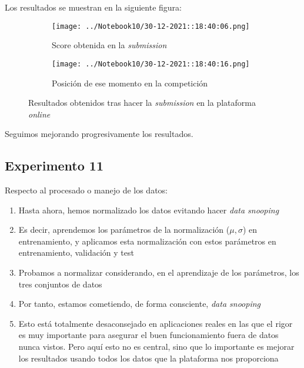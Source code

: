 \documentclass[11pt]{article}
\begin{document}
Los resultados se muestran en la siguiente figura:

\begin{figure}[H]
    \centering

    \begin{subfigure}[b]{0.45 \textwidth}
        \texttt{[image: ../Notebook10/30-12-2021::18:40:06.png]}
        \caption{Score obtenida en la \emph{submission}}
    \end{subfigure}
    \begin{subfigure}[b]{0.45 \textwidth}
        \texttt{[image: ../Notebook10/30-12-2021::18:40:16.png]}
        \caption{Posición de ese momento en la competición}
    \end{subfigure}

    \caption{Resultados obtenidos tras hacer la \emph{submission} en la plataforma \emph{online}}
\end{figure}

Seguimos mejorando progresivamente los resultados.

\pagebreak

\subsection{Experimento 11}

Respecto al procesado o manejo de los datos:

\begin{enumerate}
    \item Hasta ahora, hemos normalizado los datos evitando hacer \emph{data snooping}
    \item Es decir, aprendemos los parámetros de la normalización ($\mu, \sigma$) en entrenamiento, y aplicamos esta normalización con estos parámetros en entrenamiento, validación y test
    \item Probamos a normalizar considerando, en el aprendizaje de los parámetros, los tres conjuntos de datos
    \item Por tanto, estamos cometiendo, de forma consciente, \emph{data snooping}
    \item Esto está totalmente desaconsejado en aplicaciones reales en las que el rigor es muy importante para asegurar el buen funcionamiento fuera de datos nunca vistos. Pero aquí esto no es central, sino que lo importante es mejorar los resultados usando todos los datos que la plataforma nos proporciona
\end{enumerate}
\end{document}
